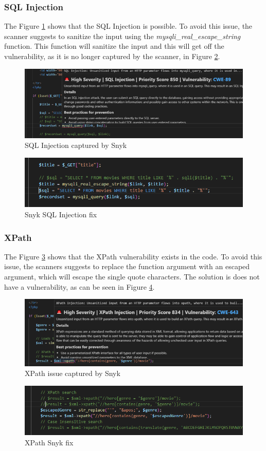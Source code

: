 \documentclass{article}
\begin{document}
\subsubsection{SQL Injection}
\par The Figure \ref{fig:snyk-sql-injection-issue} shows that the SQL Injection is possible. To avoid this issue, the scanner suggests to sanitize the input using the \textit{mysqli\_real\_escape\_string} function. This function will sanitize the input and this will get off the vulnerability, as it is no longer captured by the scanner, in Figure \ref{fig:snyk-sql-injection-fix}.
\begin{figure}[H]
    \centering
    \includegraphics[width=0.5\linewidth]{Figures/defensive/sql-injection-problem.PNG}
    \caption{SQL Injection captured by Snyk}
    \label{fig:snyk-sql-injection-issue}
\end{figure}

\begin{figure}[H]
    \centering
    \includegraphics[width=0.5\linewidth]{Figures/defensive/sql-injection-fix.PNG}
    \caption{Snyk SQL Injection fix}
    \label{fig:snyk-sql-injection-fix}
\end{figure}
\subsubsection{XPath}
\par The Figure \ref{fig:snyk-xpath-issue} shows that the XPath vulnerability exists in the code. To avoid this issue, the scanners suggests to replace the function argument with an escaped argument, which will escape the single quote characters. The solution is does not have a vulnerability, as can be seen in Figure \ref{fig:xpath-snyk-fix}.
\begin{figure}[H]
    \centering
    \includegraphics[width=0.5\linewidth]{Figures/defensive/xpath-issue-snyk.PNG}
    \caption{XPath issue captured by Snyk}
    \label{fig:snyk-xpath-issue}
\end{figure}
\begin{figure}[H]
    \centering
    \includegraphics[width=0.5\linewidth]{Figures/defensive/xpath-snyk-fix.PNG}
    \caption{XPath Snyk fix}
    \label{fig:xpath-snyk-fix}
\end{figure}
\end{document}
